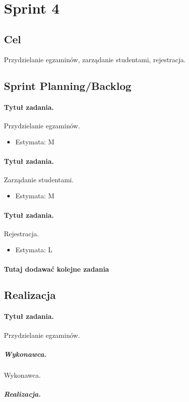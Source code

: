 \documentclass[a4paper]{article}
\begin{document}
\section{Sprint 4}

\subsection{Cel} Przydzielanie egzaminów, zarządanie studentami, rejestracja. 

\subsection{Sprint Planning/Backlog}

\paragraph{Tytuł zadania.} Przydzielanie egzaminów.
\begin{itemize}
\item Estymata: M
\end{itemize}

\paragraph{Tytuł zadania.} Zarządanie studentami.
\begin{itemize}
\item Estymata: M
\end{itemize}

\paragraph{Tytuł zadania.} Rejestracja.
\begin{itemize}
\item Estymata: L
\end{itemize}

\paragraph{Tutaj dodawać kolejne zadania}

\subsection{Realizacja}

\paragraph{Tytuł zadania.} Przydzielanie egzaminów.
\subparagraph{Wykonawca.} Wykonawca.
\subparagraph{Realizacja.} 
\end{document}
